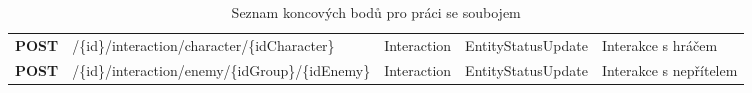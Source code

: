 \begin{table}[h]
{\begin{tabular}{>{\bfseries}r >{\ttfamily}l >{\ttfamily}l >{\ttfamily}H l}
        POST & 
            /\{id\}/interaction/character/\{idCharacter\} & 
            Interaction & EntityStatusUpdate & Interakce s hráčem \\
        POST & 
            /\{id\}/interaction/enemy/\{idGroup\}/\{idEnemy\} & 
            Interaction & EntityStatusUpdate & Interakce s nepřítelem \\
        
        \bottomrule
    \end{tabular}}
    \caption{Seznam koncových bodů pro práci se soubojem}
    \label{tab:endpoints}
\end{table}